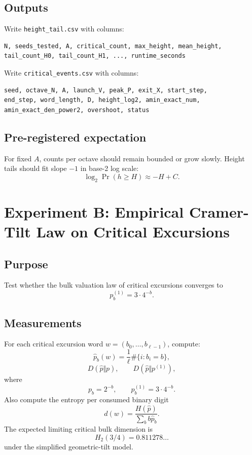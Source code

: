\documentclass[11pt]{article}
\begin{document}
\subsection{Outputs}

Write \texttt{height\_tail.csv} with columns:
\begin{lstlisting}
N, seeds_tested, A, critical_count, max_height, mean_height,
tail_count_H0, tail_count_H1, ..., runtime_seconds
\end{lstlisting}

Write \texttt{critical\_events.csv} with columns:
\begin{lstlisting}
seed, octave_N, A, launch_V, peak_P, exit_X, start_step,
end_step, word_length, D, height_log2, amin_exact_num,
amin_exact_den_power2, overshoot, status
\end{lstlisting}

\subsection{Pre-registered expectation}

For fixed \(A\), counts per octave should remain bounded or grow slowly.  Height tails should fit slope \(-1\) in base-2 log scale:
\[
        \log_2 \Pr(h\ge H)\approx -H+C.
\]

\section{Experiment B: Empirical Cramer-Tilt Law on Critical Excursions}

\subsection{Purpose}

Test whether the bulk valuation law of critical excursions converges to
\[
        p_b^{(1)}=3\cdot4^{-b}.
\]

\subsection{Measurements}

For each critical excursion word \(w=(b_0,\ldots,b_{\ell-1})\), compute:
\[
        \widehat p_b(w)=\frac{1}{\ell}\#\{i:b_i=b\},
\]
\[
        D(\widehat p\Vert p),
        \qquad
        D(\widehat p\Vert p^{(1)}),
\]
where
\[
        p_b=2^{-b},
        \qquad p_b^{(1)}=3\cdot4^{-b}.
\]
Also compute the entropy per consumed binary digit
\[
        d(w)=\frac{H(\widehat p)}{\sum_b b\widehat p_b}.
\]
The expected limiting critical bulk dimension is
\[
        H_2(3/4)=0.811278\ldots
\]
under the simplified geometric-tilt model.
\end{document}
